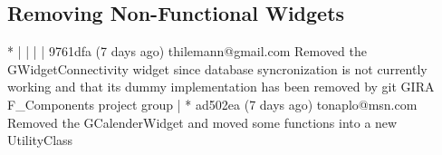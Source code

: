 \subsection{Removing Non-Functional Widgets}
* | | | | 9761dfa (7 days ago) thilemann@gmail.com Removed the GWidgetConnectivity widget since database syncronization is not currently working and that its dummy implementation has been removed by git GIRA
F\_Components project group
| * ad502ea (7 days ago) tonaplo@msn.com Removed the GCalenderWidget and moved some functions into a new UtilityClass